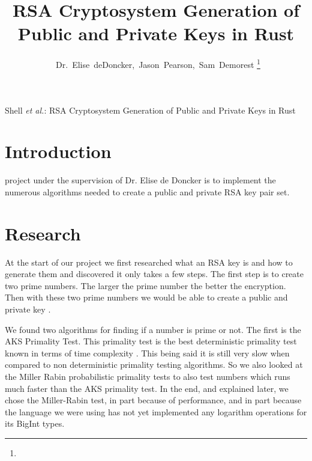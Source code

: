 \documentclass[11pt,technote]{IEEEtran}
\begin{document}
\lstset{language=bash}
%
\title{RSA Cryptosystem Generation of Public and Private Keys in Rust}
\author{~Dr.~Elise~deDoncker,~Jason~Pearson,~Sam~Demorest%
\thanks{}}

\markboth{}%
{Shell \MakeLowercase{\textit{et al.}}: RSA Cryptosystem Generation of Public 
and Private Keys in Rust}





\maketitle

\IEEEdisplaynotcompsoctitleabstractindextext
\IEEEpeerreviewmaketitle



\section{Introduction}
 project under the supervision of Dr. Elise de Doncker is 
to implement the numerous algorithms needed to create a public and private RSA 
key pair set. 


\section{Research}
At the start of our project we first researched what an RSA key is and how to 
generate them and discovered it only takes a few steps. The first step is to 
create two prime numbers. The larger the prime number the better the encryption. 
Then with these two prime numbers we would be able to create a public and 
private key \cite{fastrsa}. 

\par We found two algorithms for finding if a number is prime or 
not. The first is the AKS Primality Test. This primality test is the best 
deterministic primality test known in terms of time complexity \cite{neap}.
This being said it is still very slow when compared to non deterministic 
primality testing algorithms. So we also looked at the Miller Rabin 
probabilistic primality tests to also test numbers which runs much faster than 
the AKS primality test. In the end, and explained later, we chose the 
Miller-Rabin test, in part because of performance, and in part because the 
language we were using has not yet implemented any logarithm operations for its 
BigInt types.
\end{document}
